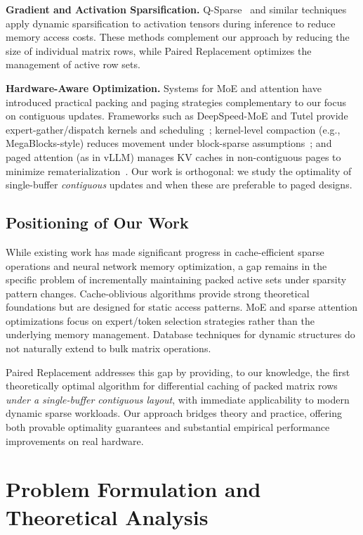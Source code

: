 \documentclass{article}
\numberwithin{equation}{section}
\theoremstyle{plain}
\theoremstyle{definition}
\theoremstyle{remark}
\begin{document}
\textbf{Gradient and Activation Sparsification.} Q-Sparse~\cite{wang2024q} and similar techniques apply dynamic sparsification to activation tensors during inference to reduce memory access costs. These methods complement our approach by reducing the size of individual matrix rows, while Paired Replacement optimizes the management of active row sets.

\textbf{Hardware-Aware Optimization.} Systems for MoE and attention have introduced practical packing and paging strategies complementary to our focus on contiguous updates. Frameworks such as DeepSpeed-MoE and Tutel provide expert-gather/dispatch kernels and scheduling~\cite{deepspeedmoe2022,tutel2022}; kernel-level compaction (e.g., MegaBlocks-style) reduces movement under block-sparse assumptions~\cite{megablocks2022}; and paged attention (as in vLLM) manages KV caches in non-contiguous pages to minimize rematerialization~\cite{vllm2023}. Our work is orthogonal: we study the optimality of single-buffer \emph{contiguous} updates and when these are preferable to paged designs.

\subsection{Positioning of Our Work}

While existing work has made significant progress in cache-efficient sparse operations and neural network memory optimization, a gap remains in the specific problem of incrementally maintaining packed active sets under sparsity pattern changes. Cache-oblivious algorithms provide strong theoretical foundations but are designed for static access patterns. MoE and sparse attention optimizations focus on expert/token selection strategies rather than the underlying memory management. Database techniques for dynamic structures do not naturally extend to bulk matrix operations.

Paired Replacement addresses this gap by providing, to our knowledge, the first theoretically optimal algorithm for differential caching of packed matrix rows \emph{under a single-buffer contiguous layout}, with immediate applicability to modern dynamic sparse workloads. Our approach bridges theory and practice, offering both provable optimality guarantees and substantial empirical performance improvements on real hardware.

\section{Problem Formulation and Theoretical Analysis} \label{sec:problem}
\end{document}
